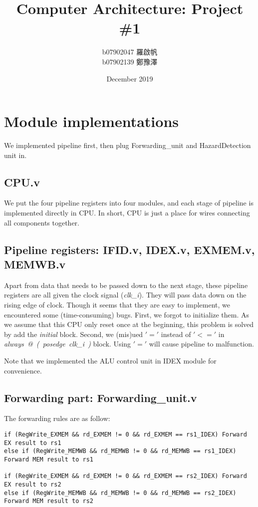 \documentclass{article}
\title{Computer Architecture: Project \#1}
\author{b07902047 羅啟帆\\ b07902139 鄭豫澤}
\date{December 2019}
\begin{document}
\maketitle


\section{Module implementations}
We implemented pipeline first, then plug Forwarding\_unit and HazardDetection unit in.

\subsection{CPU.v}
We put the four pipeline registers into four modules, and each stage of pipeline is implemented directly in CPU. In short, CPU is just a place for wires connecting all components together.

\subsection{Pipeline registers: IFID.v, IDEX.v, EXMEM.v, MEMWB.v}
Apart from data that needs to be passed down to the next stage, these pipeline registers are all given the clock signal (\textit{clk\_i}). They will pass data down on the rising edge of clock. Though it seems that they are easy to implement, we encountered some (time-consuming) bugs. First, we forgot to initialize them. As we assume that this CPU only reset once at the beginning, this problem is solved by add the \textit{initial} block. Second, we (mis)ued $'='$ instead of $'<='$ in \textit{always\ @\ (\ posedge\ clk\_i\ )} block. Using $'='$ will cause pipeline to malfunction.

Note that we implemented the ALU control unit in IDEX module for convenience.

\subsection{Forwarding part: Forwarding\_unit.v}
The forwarding rules are as follow:

\begin{lstlisting}[language=text, caption=Rules, xleftmargin=10pt, xrightmargin=10pt, mathescape=true]
if (RegWrite_EXMEM && rd_EXMEM != 0 && rd_EXMEM == rs1_IDEX) Forward EX result to rs1
else if (RegWrite_MEMWB && rd_MEMWB != 0 && rd_MEMWB == rs1_IDEX) Forward MEM result to rs1

if (RegWrite_EXMEM && rd_EXMEM != 0 && rd_EXMEM == rs2_IDEX) Forward EX result to rs2
else if (RegWrite_MEMWB && rd_MEMWB != 0 && rd_MEMWB == rs2_IDEX) Forward MEM result to rs2\end{lstlisting}
\end{document}
